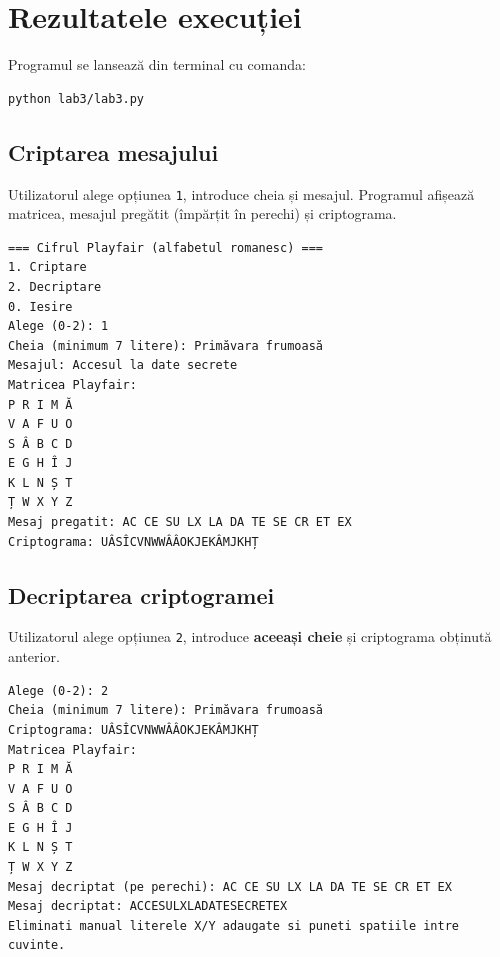 \documentclass[12pt,a4paper]{article}
\begin{document}
\section{Rezultatele execuției}

Programul se lansează din terminal cu comanda:
\begin{lstlisting}[style=terminal]
python lab3/lab3.py
\end{lstlisting}

\subsection{Criptarea mesajului}

Utilizatorul alege opțiunea \texttt{1}, introduce cheia și mesajul. Programul
afișează matricea, mesajul pregătit (împărțit în perechi) și criptograma.

\begin{lstlisting}[style=terminal, caption={Criptarea mesajului \enquote{Accesul la date secrete}}]
=== Cifrul Playfair (alfabetul romanesc) ===
1. Criptare
2. Decriptare
0. Iesire
Alege (0-2): 1
Cheia (minimum 7 litere): Primăvara frumoasă
Mesajul: Accesul la date secrete
Matricea Playfair:
P R I M Ă
V A F U O
S Â B C D
E G H Î J
K L N Ș T
Ț W X Y Z
Mesaj pregatit: AC CE SU LX LA DA TE SE CR ET EX
Criptograma: UÂSÎCVNWWÂÂOKJEKÂMJKHȚ
\end{lstlisting}


\subsection{Decriptarea criptogramei}

Utilizatorul alege opțiunea \texttt{2}, introduce \textbf{aceeași cheie} și
criptograma obținută anterior.

\begin{lstlisting}[style=terminal, caption={Decriptarea criptogramei}]
Alege (0-2): 2
Cheia (minimum 7 litere): Primăvara frumoasă
Criptograma: UÂSÎCVNWWÂÂOKJEKÂMJKHȚ
Matricea Playfair:
P R I M Ă
V A F U O
S Â B C D
E G H Î J
K L N Ș T
Ț W X Y Z
Mesaj decriptat (pe perechi): AC CE SU LX LA DA TE SE CR ET EX
Mesaj decriptat: ACCESULXLADATESECRETEX
Eliminati manual literele X/Y adaugate si puneti spatiile intre cuvinte.
\end{lstlisting}
\end{document}

